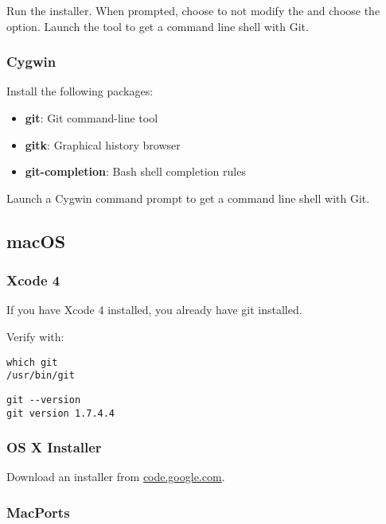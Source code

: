 Run the installer. When prompted, choose to not modify the  and
choose the  option. Launch the  tool to
get a command line shell with Git.


\subsubsection{Cygwin}
\label{subsubsec:Cygwin}

Install the following packages:
\begin{itemize}
\item \textbf{git}: Git command-line tool
\item \textbf{gitk}: Graphical history browser
\item \textbf{git-completion}: Bash shell completion rules
\end{itemize}

Launch a Cygwin command prompt to get a command line shell with Git.


\subsection{macOS}
\label{subsec:macOS}

\subsubsection{Xcode 4}
\label{subsubsec:Xcode4}

If you have Xcode 4 installed, you already have git installed.

Verify with:
\begin{verbatim}
which git
/usr/bin/git
\end{verbatim}

\begin{verbatim}
git --version
git version 1.7.4.4
\end{verbatim}


\subsubsection{OS X Installer}
\label{subsubsec:OSXInstaller}

Download an installer from
\href{https://code.google.com/archive/p/git-osx-installer/}{code.google.com}.


\subsubsection{MacPorts}
\label{subsubsec:MacPorts}

